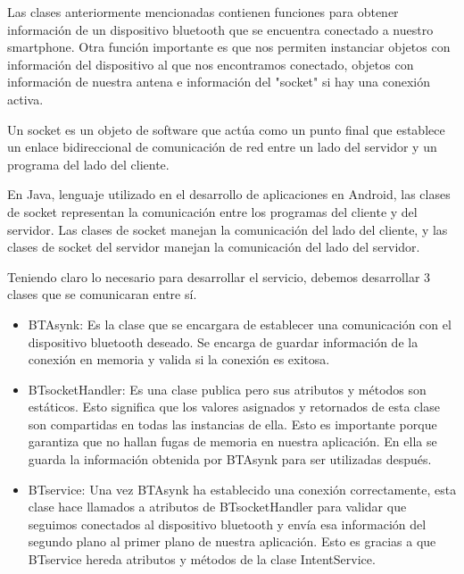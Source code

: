 \par \noindent
Las clases anteriormente mencionadas contienen funciones para obtener información de un dispositivo bluetooth que se encuentra conectado a nuestro smartphone. Otra función importante es que nos permiten instanciar objetos con información del dispositivo al que nos encontramos conectado, objetos con información de nuestra antena e información del "socket" si hay una conexión activa. 

\par \noindent
Un socket es un objeto de software que actúa como un punto final que establece un enlace bidireccional de comunicación de red entre un lado del servidor y un programa del lado del cliente.\cite{socket}

\par \noindent
En Java, lenguaje utilizado en el desarrollo de aplicaciones en Android, las clases de socket representan la comunicación entre los programas del cliente y del servidor. Las clases de socket manejan la comunicación del lado del cliente, y las clases de socket del servidor manejan la comunicación del lado del servidor.\cite{socket}

\par \noindent
Teniendo claro lo necesario para desarrollar el servicio, debemos desarrollar 3 clases que se comunicaran entre sí.

\begin{itemize}
	\item BTAsynk: Es la clase que se encargara de establecer una comunicación con el dispositivo bluetooth deseado. Se encarga de guardar información de la conexión en memoria y valida si la conexión es exitosa.
	
	\item BTsocketHandler: Es una clase publica pero sus atributos y métodos son estáticos. Esto significa que los valores asignados y retornados de esta clase son compartidas en todas las instancias de ella. Esto es importante porque garantiza que no hallan fugas de memoria en nuestra aplicación. En ella se guarda la información obtenida por BTAsynk para ser utilizadas después.
	
	\item BTservice: Una vez BTAsynk ha establecido una conexión correctamente, esta clase hace llamados a atributos de BTsocketHandler para validar que seguimos conectados al dispositivo bluetooth y envía esa información del segundo plano al primer plano de nuestra aplicación. Esto es gracias a que BTservice hereda atributos y métodos de la clase IntentService.
	
\end{itemize}


